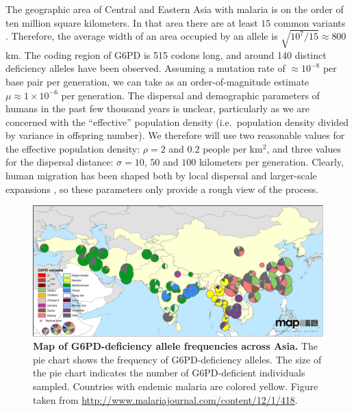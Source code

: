 \documentclass{article}
\begin{document}


The geographic area of Central and Eastern Asia with malaria is 
on the order of ten million square kilometers.
In that area there are at least $15$ common variants \citep[see Figure \ref{fig-G6PD-map}][]{Howes-g6pd-variants}. 
Therefore, the average width of an area occupied by an allele is $\sqrt{10^7/15} \approx  800$km. 
The coding region of G6PD is 515 codons long, 
and around 140 distinct deficiency alleles have been observed. 
Assuming a mutation rate of $\approx 10^{-8}$ per base pair per generation, 
we can take as an order-of-magnitude estimate $\mu \approx 1 \times 10^{-6}$ per generation. 
The dispersal and demographic parameters of humans in the past few thousand years is unclear,
particularly as we are concerned with the ``effective'' population density
(i.e.\ population density divided by variance in offspring number).
We therefore will use two reasonable values for the effective population density: $\rho=2$ and $0.2$ people per km$^2$,
and three values for the dispersal distance: $\sigma=10$, $50$ and $100$ kilometers per generation.
Clearly, human migration has been shaped both by local dispersal and larger-scale expansions 
\citep[see][for a recent discussion]{Pickrell:14}, 
so these parameters only provide a rough view of the process.

\begin{figure}[ht]
\begin{center}
  \includegraphics[width=1.0\textwidth]{G6pd_Howes_et_al_1475-2875-12-418-4}   %
\caption{ 
{\bf Map of G6PD-deficiency allele frequencies across Asia.} 
The pie chart shows the frequency of G6PD-deficiency alleles. 
The size of the pie chart indicates the number of G6PD-deficient individuals sampled.
Countries with endemic malaria are colored yellow. 
Figure taken from \citet{Howes-g6pd-variants}
\url{http://www.malariajournal.com/content/12/1/418}. 
} \label{fig-G6PD-map}
\end{center}
\end{figure}
\end{document}
